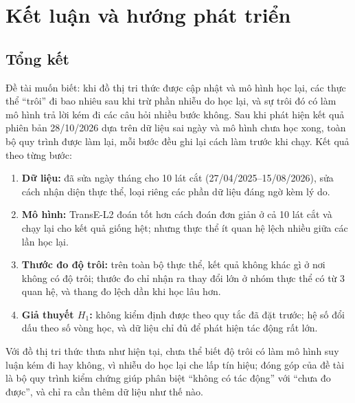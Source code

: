 \chapter{Kết luận và hướng phát triển}
\label{chap:conclusion}

\section{Tổng kết}
\label{sec:summary}
Đề tài muốn biết: khi đồ thị tri thức được cập nhật và mô hình học lại, các thực thể ``trôi'' đi bao nhiêu sau khi trừ phần nhiễu do học lại, và sự trôi đó có làm mô hình trả lời kém đi các câu hỏi nhiều bước không. Sau khi phát hiện kết quả phiên bản 28/10/2026 dựa trên dữ liệu sai ngày và mô hình chưa học xong, toàn bộ quy trình được làm lại, mỗi bước đều ghi lại cách làm trước khi chạy. Kết quả theo từng bước:
\begin{enumerate}
    \item \textbf{Dữ liệu:} đã sửa ngày tháng cho 10 lát cắt (27/04/2025--15/08/2026), sửa cách nhận diện thực thể, loại riêng các phần dữ liệu đáng ngờ kèm lý do.
    \item \textbf{Mô hình:} TransE-L2 đoán tốt hơn cách đoán đơn giản ở cả 10 lát cắt và chạy lại cho kết quả giống hệt; nhưng thực thể ít quan hệ lệch nhiều giữa các lần học lại.
    \item \textbf{Thước đo độ trôi:} trên toàn bộ thực thể, kết quả không khác gì ở nơi không có độ trôi; thước đo chỉ nhận ra thay đổi lớn ở nhóm thực thể có từ 3 quan hệ, và thang đo lệch dần khi học lâu hơn.
    \item \textbf{Giả thuyết $H_1$:} không kiểm định được theo quy tắc đã đặt trước; hệ số đổi dấu theo số vòng học, và dữ liệu chỉ đủ để phát hiện tác động rất lớn.
\end{enumerate}

\begin{remark}
Với đồ thị tri thức thưa như hiện tại, chưa thể biết độ trôi có làm mô hình suy luận kém đi hay không, vì nhiễu do học lại che lấp tín hiệu; đóng góp của đề tài là bộ quy trình kiểm chứng giúp phân biệt ``không có tác động'' với ``chưa đo được'', và chỉ ra cần thêm dữ liệu như thế nào.
\end{remark}


